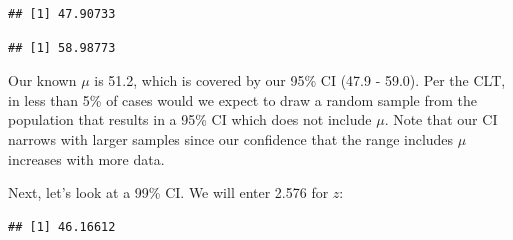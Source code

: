 \documentclass[]{book}
\newenvironment{Shaded}{\begin{snugshade}}{\end{snugshade}}
\newcommand{\CommentTok}[1]{\textcolor[rgb]{0.56,0.35,0.01}{\textit{#1}}}
\newcommand{\DecValTok}[1]{\textcolor[rgb]{0.00,0.00,0.81}{#1}}
\newcommand{\FloatTok}[1]{\textcolor[rgb]{0.00,0.00,0.81}{#1}}
\newcommand{\KeywordTok}[1]{\textcolor[rgb]{0.13,0.29,0.53}{\textbf{#1}}}
\newcommand{\NormalTok}[1]{#1}
\newcommand{\OperatorTok}[1]{\textcolor[rgb]{0.81,0.36,0.00}{\textbf{#1}}}
\newcommand{\StringTok}[1]{\textcolor[rgb]{0.31,0.60,0.02}{#1}}
\begin{document}
\begin{verbatim}
## [1] 47.90733
\end{verbatim}

\begin{Shaded}
\end{Shaded}

\begin{verbatim}
## [1] 58.98773
\end{verbatim}

Our known \(\mu\) is 51.2, which is covered by our 95\% CI (47.9 - 59.0). Per the CLT, in less than 5\% of cases would we expect to draw a random sample from the population that results in a 95\% CI which does not include \(\mu\). Note that our CI narrows with larger samples since our confidence that the range includes \(\mu\) increases with more data.

Next, let's look at a 99\% CI. We will enter 2.576 for \(z\):

\begin{Shaded}
\end{Shaded}

\begin{Shaded}
\end{Shaded}

\begin{verbatim}
## [1] 46.16612
\end{verbatim}

\begin{Shaded}
\end{Shaded}
\end{document}
